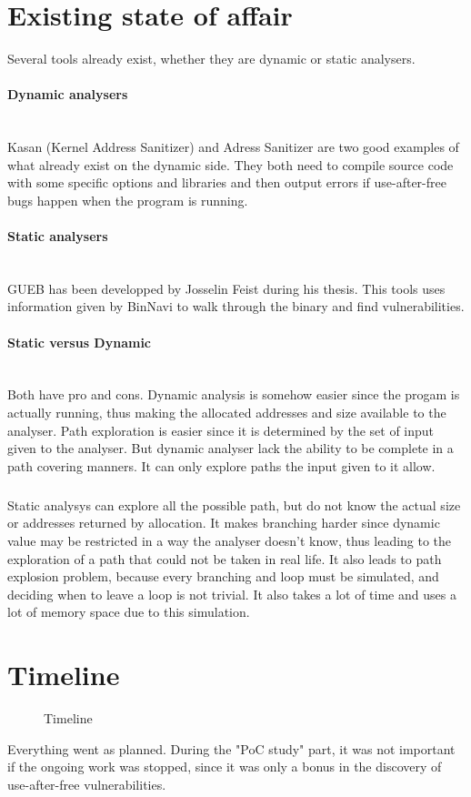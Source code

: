 \documentclass[a4paper, 12pt]{report}
\newcommand{\myparagraph}[1]{\paragraph{#1}\mbox{}\newline\\}
\begin{document}
\section*{Existing state of affair}
Several tools already exist, whether they are dynamic or static analysers.
\myparagraph{Dynamic analysers}
Kasan (Kernel Address Sanitizer) and Adress Sanitizer are two good examples of what already exist on the dynamic side. They both need to compile source code with some specific options and libraries and then output errors if use-after-free bugs happen when the program is running.
\myparagraph{Static analysers}
GUEB has been developped by Josselin Feist during his thesis. This tools uses information given by BinNavi to walk through the binary and find vulnerabilities.
\myparagraph{Static versus Dynamic}
Both have pro and cons. Dynamic analysis is somehow easier since the progam is actually running, thus making the allocated addresses and size available to the analyser. Path exploration is easier since it is determined by the set of input given to the analyser. But dynamic analyser lack the ability to be complete in a path covering manners. It can only explore paths the input given to it allow.
\subparagraph{}
Static analysys can explore all the possible path, but do not know the actual size or addresses returned by allocation. It makes branching harder since dynamic value may be restricted in a way the analyser doesn't know, thus leading to the exploration of a path that could not be taken in real life. It also leads to path explosion problem, because every branching and loop must be simulated, and deciding when to leave a loop is not trivial. It also takes a lot of time and uses a lot of memory space due to this simulation.

\newpage
\section*{Timeline}
\begin{figure}[h]
\begin{center}
    \newline
    \caption{Timeline}
\end{center}
\end{figure}
Everything went as planned. During the "PoC study" part, it was not important if the ongoing work was stopped, since it was only a bonus in the discovery of use-after-free vulnerabilities.
\end{document}
